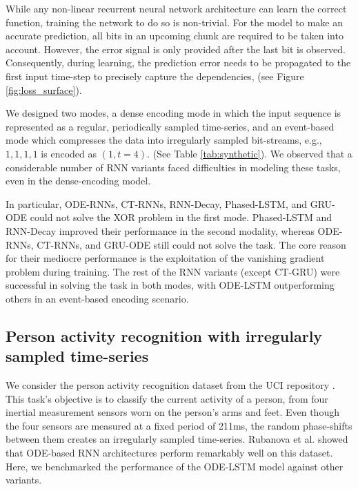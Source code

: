 \documentclass{article}
\begin{document}
While any non-linear recurrent neural network architecture can learn the correct function, training the network to do so is non-trivial. For the model to make an accurate prediction, all bits in an upcoming chunk are required to be taken into account. However, the error signal is only provided after the last bit is observed. Consequently, during learning, the prediction error needs to be propagated to the first input time-step to precisely capture the dependencies, (see Figure \ref{fig:loss_surface}).

We designed two modes, a dense encoding mode in which the input sequence is represented as a regular, periodically sampled time-series, and an event-based mode which compresses the data into irregularly sampled bit-streams, e.g., $1,1,1,1$ is encoded as $(1,t=4)$. (See Table \ref{tab:synthetic}). We observed that a considerable number of RNN variants faced difficulties in modeling these tasks, even in the dense-encoding model. 

In particular, ODE-RNNs, CT-RNNs, RNN-Decay, Phased-LSTM, and GRU-ODE could not solve the XOR problem in the first mode. Phased-LSTM and RNN-Decay improved their performance in the second modality, whereas ODE-RNNs, CT-RNNs, and GRU-ODE still could not solve the task. The core reason for their mediocre performance is the exploitation of the vanishing gradient problem during training. The rest of the RNN variants (except CT-GRU) were successful in solving the task in both modes, with ODE-LSTM outperforming others in an event-based encoding scenario. 



\subsection{Person activity recognition with irregularly sampled time-series}


We consider the person activity recognition dataset from the UCI repository \cite{dua2019}. This task's objective is to classify the current activity of a person, from four inertial measurement sensors worn on the person's arms and feet. Even though the four sensors are measured at a fixed period of 211ms, the random phase-shifts between them creates an irregularly sampled time-series. Rubanova et al. \cite{rubanova2019latent} showed that ODE-based RNN architectures perform remarkably well on this dataset. Here, we benchmarked the performance of the ODE-LSTM model against other variants.
\end{document}
